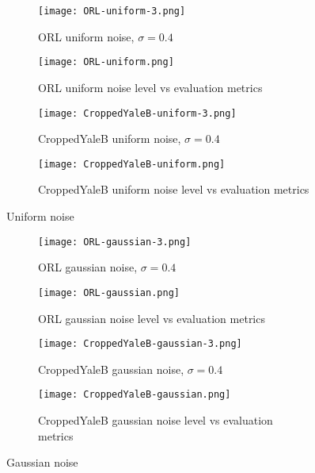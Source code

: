 \documentclass{article} %
\begin{document}
\begin{figure}
\begin{subfigure}{\linewidth}
\texttt{[image: ORL-uniform-3.png]}
\caption{ORL uniform noise, $\sigma=0.4$}
\end{subfigure}
\begin{subfigure}{\linewidth}
\texttt{[image: ORL-uniform.png]}
\caption{ORL uniform noise level vs evaluation metrics}
\end{subfigure}
\begin{subfigure}{\linewidth}
\texttt{[image: CroppedYaleB-uniform-3.png]}
\caption{CroppedYaleB uniform noise, $\sigma=0.4$}
\end{subfigure}
\begin{subfigure}{\linewidth}
\texttt{[image: CroppedYaleB-uniform.png]}
\caption{CroppedYaleB uniform noise level vs evaluation metrics}
\end{subfigure}
\caption{Uniform noise}
\end{figure}

\begin{figure}
\begin{subfigure}{\linewidth}
\texttt{[image: ORL-gaussian-3.png]}
\caption{ORL gaussian noise, $\sigma=0.4$}
\end{subfigure}
\begin{subfigure}{\linewidth}
\texttt{[image: ORL-gaussian.png]}
\caption{ORL gaussian noise level vs evaluation metrics}
\end{subfigure}
\begin{subfigure}{\linewidth}
\texttt{[image: CroppedYaleB-gaussian-3.png]}
\caption{CroppedYaleB gaussian noise, $\sigma=0.4$}
\end{subfigure}
\begin{subfigure}{\linewidth}
\texttt{[image: CroppedYaleB-gaussian.png]}
\caption{CroppedYaleB gaussian noise level vs evaluation metrics}
\end{subfigure}
\caption{Gaussian noise}
\end{figure}
\end{document}
